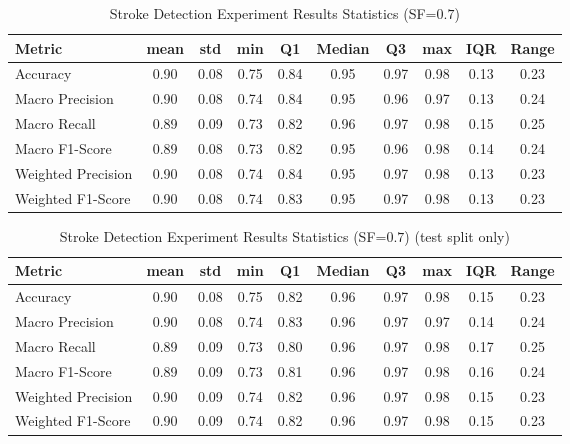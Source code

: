 \begin{table}[h]
\caption{Stroke Detection Experiment Results Statistics (SF=$0.7$)}
\label{tab:sf0.7_Stroke_Detection_Results_Statistics}
\begin{tabular}{|l|c|c|c|c|c|c|c|c|c|}
\toprule
Metric & mean & std & min & Q1 & Median & Q3 & max & IQR & Range \\
\midrule
Accuracy & 0.90 & 0.08 & 0.75 & 0.84 & 0.95 & 0.97 & 0.98 & 0.13 & 0.23 \\
Macro Precision & 0.90 & 0.08 & 0.74 & 0.84 & 0.95 & 0.96 & 0.97 & 0.13 & 0.24 \\
Macro Recall & 0.89 & 0.09 & 0.73 & 0.82 & 0.96 & 0.97 & 0.98 & 0.15 & 0.25 \\
Macro F1-Score & 0.89 & 0.08 & 0.73 & 0.82 & 0.95 & 0.96 & 0.98 & 0.14 & 0.24 \\
Weighted Precision & 0.90 & 0.08 & 0.74 & 0.84 & 0.95 & 0.97 & 0.98 & 0.13 & 0.23 \\
Weighted F1-Score & 0.90 & 0.08 & 0.74 & 0.83 & 0.95 & 0.97 & 0.98 & 0.13 & 0.23 \\
\bottomrule
\end{tabular}
\end{table}

\begin{table}[h]
\caption{Stroke Detection Experiment Results Statistics (SF=$0.7$) (test split only)}
\label{tab:sf0.7_testStroke_Detection_Results_Statistics}
\begin{tabular}{|l|c|c|c|c|c|c|c|c|c|}
\toprule
Metric & mean & std & min & Q1 & Median & Q3 & max & IQR & Range \\
\midrule
Accuracy & 0.90 & 0.08 & 0.75 & 0.82 & 0.96 & 0.97 & 0.98 & 0.15 & 0.23 \\
Macro Precision & 0.90 & 0.08 & 0.74 & 0.83 & 0.96 & 0.97 & 0.97 & 0.14 & 0.24 \\
Macro Recall & 0.89 & 0.09 & 0.73 & 0.80 & 0.96 & 0.97 & 0.98 & 0.17 & 0.25 \\
Macro F1-Score & 0.89 & 0.09 & 0.73 & 0.81 & 0.96 & 0.97 & 0.98 & 0.16 & 0.24 \\
Weighted Precision & 0.90 & 0.09 & 0.74 & 0.82 & 0.96 & 0.97 & 0.98 & 0.15 & 0.23 \\
Weighted F1-Score & 0.90 & 0.09 & 0.74 & 0.82 & 0.96 & 0.97 & 0.98 & 0.15 & 0.23 \\
\bottomrule
\end{tabular}
\end{table}

